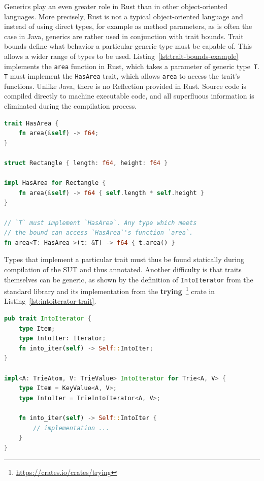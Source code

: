 \documentclass{article}
\begin{document}
Generics play an even greater role in Rust than in other object-oriented languages. More precisely, Rust is not a typical object-oriented language and instead of using direct types, for example as method parameters, as is often the case in Java, generics are rather used in conjunction with trait bounds. Trait bounds define what behavior a particular generic type must be capable of. This allows a wider range of types to be used. Listing~\ref{lst:trait-bounds-example} implements the \lstinline{area} function in Rust, which takes a parameter of generic type~\lstinline{T}. \lstinline{T} must implement the \lstinline{HasArea} trait, which allows \lstinline{area} to access the trait's functions. Unlike Java, there is no Reflection provided in Rust. Source code is compiled directly to machine executable code, and all superfluous information is eliminated during the compilation process.

\begin{lstlisting}[language=Rust, style=boxed, caption={A function that takes a generic types and specifies a bound}, label=lst:trait-bounds-example]
trait HasArea {
    fn area(&self) -> f64;
}

struct Rectangle { length: f64, height: f64 }

impl HasArea for Rectangle {
    fn area(&self) -> f64 { self.length * self.height }
}

// `T` must implement `HasArea`. Any type which meets
// the bound can access `HasArea`'s function `area`.
fn area<T: HasArea >(t: &T) -> f64 { t.area() }
\end{lstlisting}

Types that implement a particular trait must thus be found statically during compilation of the \ac{SUT} and thus annotated. Another difficulty is that traits themselves can be generic, as shown by the definition of \lstinline{IntoIterator} from the standard library and its implementation from the \textbf{trying}~\footnote{\url{https://crates.io/crates/trying}} crate in Listing~\ref{lst:intoiterator-trait}.

\begin{lstlisting}[language=Rust, style=boxed, caption={IntoIterator implementation in the \textbf{trying} crate}, label=lst:intoiterator-trait]
pub trait IntoIterator {
    type Item;
    type IntoIter: Iterator;
    fn into_iter(self) -> Self::IntoIter;
}

impl<A: TrieAtom, V: TrieValue> IntoIterator for Trie<A, V> {
    type Item = KeyValue<A, V>;
    type IntoIter = TrieIntoIterator<A, V>;

    fn into_iter(self) -> Self::IntoIter {
        // implementation ...
    }
}
\end{lstlisting}
\end{document}
